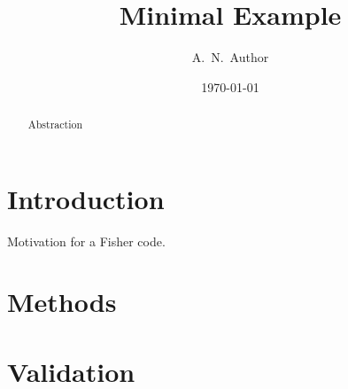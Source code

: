 \documentclass[modern]{lsstdescnote}
\begin{document}
\title{Minimal Example}
\author{A.\ N.\ Author}
\date{\today}

\begin{abstract}
  Abstraction
\end{abstract}

\maketitle

\section{Introduction}
Motivation for a Fisher code.

\section{Methods}

\section{Validation}
\end{document}
